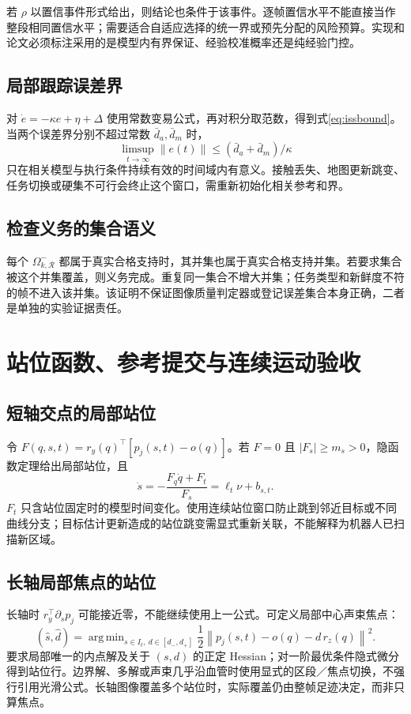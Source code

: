 \documentclass[UTF8,11pt,a4paper,fontset=fandol]{ctexart}
\numberwithin{equation}{section}
\theoremstyle{definition}
\newcommand{\norm}[1]{\left\lVert#1\right\rVert}
\DeclareMathOperator{\argmin}{arg\,min}
\begin{document}
若 $\rho$ 以置信事件形式给出，则结论也条件于该事件。逐帧置信水平不能直接当作整段相同置信水平；需要适合自适应选择的统一界或预先分配的风险预算。实现和论文必须标注采用的是模型内有界保证、经验校准概率还是纯经验门控。

\subsection{局部跟踪误差界}
对 $\dot e=-\kappa e+\eta+\Delta$ 使用常数变易公式，再对积分取范数，得到式\eqref{eq:issbound}。当两个误差界分别不超过常数 $\bar d_a,\bar d_m$ 时，
\begin{equation}
\limsup_{t\to\infty}\norm{e(t)}
\le(\bar d_a+\bar d_m)/\kappa
\end{equation}
只在相关模型与执行条件持续有效的时间域内有意义。接触丢失、地图更新跳变、任务切换或硬集不可行会终止这个窗口，需重新初始化相关参考和界。

\subsection{检查义务的集合语义}
每个 $\Omega^-_{k,\mathcal R}$ 都属于真实合格支持时，其并集也属于真实合格支持并集。若要求集合被这个并集覆盖，则义务完成。重复同一集合不增大并集；任务类型和新鲜度不符的帧不进入该并集。该证明不保证图像质量判定器或登记误差集合本身正确，二者是单独的实验证据责任。

\section{站位函数、参考提交与连续运动验收}
\label{app:phase}
\subsection{短轴交点的局部站位}
令 $F(q,s,t)=r_y(q)^\top[p_j(s,t)-o(q)]$。若 $F=0$ 且 $|F_s|\ge m_s>0$，隐函数定理给出局部站位，且
\begin{equation}
\dot s=-\frac{F_q\dot q+F_t}{F_s}
=\ell_t\nu+b_{s,t}.
\label{eq:implicitstation}
\end{equation}
$F_t$ 只含站位固定时的模型时间变化。使用连续站位窗口防止跳到邻近目标或不同曲线分支；目标估计更新造成的站位跳变需显式重新关联，不能解释为机器人已扫描新区域。

\subsection{长轴局部焦点的站位}
长轴时 $r_y^\top\partial_sp_j$ 可能接近零，不能继续使用上一公式。可定义局部中心声束焦点：
\begin{equation}
(\widehat s,\widehat d)=
\argmin_{s\in I_t,\ d\in[d_-,d_+]}
\frac12\norm{p_j(s,t)-o(q)-d\,r_z(q)}^2.
\label{eq:longstation}
\end{equation}
要求局部唯一的内点解及关于 $(s,d)$ 的正定 Hessian；对一阶最优条件隐式微分得到站位行。边界解、多解或声束几乎沿血管时使用显式的区段／焦点切换，不强行引用光滑公式。长轴图像覆盖多个站位时，实际覆盖仍由整帧足迹决定，而非只算焦点。
\end{document}
